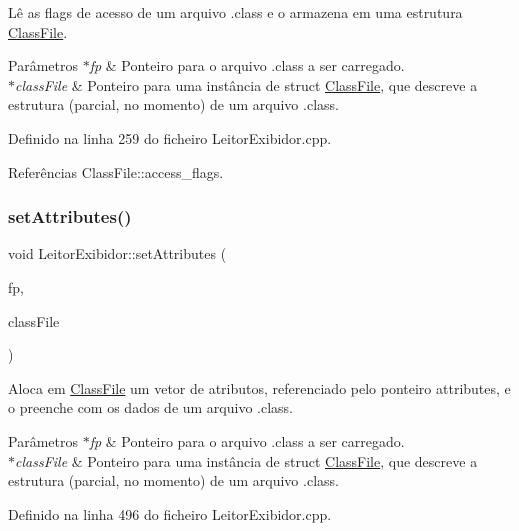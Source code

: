 Lê as flags de acesso de um arquivo .class e o armazena em uma estrutura \hyperlink{classClassFile}{Class\+File}. 
\begin{DoxyParams}{Parâmetros}
{\em $\ast$fp} & Ponteiro para o arquivo .class a ser carregado. \\
\hline
{\em $\ast$class\+File} & Ponteiro para uma instância de struct \hyperlink{classClassFile}{Class\+File}, que descreve a estrutura (parcial, no momento) de um arquivo .class. \\
\hline
\end{DoxyParams}


Definido na linha 259 do ficheiro Leitor\+Exibidor.\+cpp.



Referências Class\+File\+::access\+\_\+flags.

\mbox{\label{classLeitorExibidor_a988287e777377265b23482e307eb4a63}} 
\subsubsection{\texorpdfstring{set\+Attributes()}{setAttributes()}}
{\footnotesize\ttfamily void Leitor\+Exibidor\+::set\+Attributes (\begin{DoxyParamCaption}\item[{F\+I\+LE $\ast$}]{fp,  }\item[{\hyperlink{classClassFile}{Class\+File} $\ast$}]{class\+File }\end{DoxyParamCaption})\hspace{0.3cm}{\ttfamily [private]}}

Aloca em \hyperlink{classClassFile}{Class\+File} um vetor de atributos, referenciado pelo ponteiro attributes, e o preenche com os dados de um arquivo .class. 
\begin{DoxyParams}{Parâmetros}
{\em $\ast$fp} & Ponteiro para o arquivo .class a ser carregado. \\
\hline
{\em $\ast$class\+File} & Ponteiro para uma instância de struct \hyperlink{classClassFile}{Class\+File}, que descreve a estrutura (parcial, no momento) de um arquivo .class. \\
\hline
\end{DoxyParams}


Definido na linha 496 do ficheiro Leitor\+Exibidor.\+cpp.



